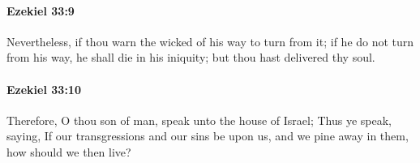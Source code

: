 		\paragraph{Ezekiel 33:9} %
			\label{EZEKIEL-33-9}

			Nevertheless, if thou warn the wicked of his way to turn from it; if he do not turn from his way, he shall die in his iniquity; but thou hast delivered thy soul.


		\paragraph{Ezekiel 33:10} %
			\label{EZEKIEL-33-10}

			Therefore, O thou son of man, speak unto the house of Israel; Thus ye speak, saying, If our transgressions and our sins be upon us, and we pine away in them, how should we then live?


